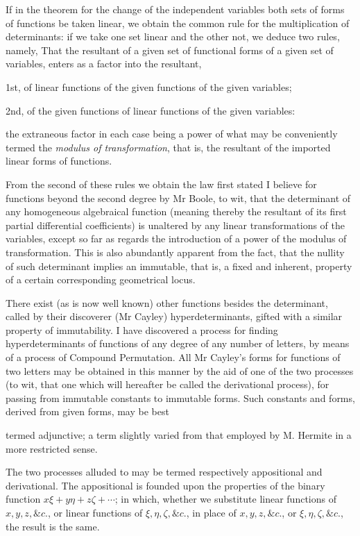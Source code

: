 \documentclass[11pt]{article}
\newcommand{\sourcepage}[1]{\marginpar{\scriptsize p.~#1}}
\begin{document}
{{If in the theorem for the change of the independent variables both sets of forms of functions be taken linear, we obtain the common rule for the multiplication of determinants: if we take one set linear and the other not, we deduce two rules, namely, That the resultant of a given set of functional forms of a given set of variables, enters as a factor into the resultant,

1st, of linear functions of the given functions of the given variables;

2nd, of the given functions of linear functions of the given variables:

the extraneous factor in each case being a power of what may be conveniently termed the \emph{modulus of transformation}, that is, the resultant of the imported linear forms of functions.

From the second of these rules we obtain the law first stated I believe for functions beyond the second degree by Mr Boole, to wit, that the determinant of any homogeneous algebraical function (meaning thereby the resultant of its first partial differential coefficients) is unaltered by any linear transformations of the variables, except so far as regards the introduction of a power of the modulus of transformation. This is also abundantly apparent from the fact, that the nullity of such determinant implies an immutable, that is, a fixed and inherent, property of a certain corresponding geometrical locus.

There exist (as is now well known) other functions besides the determinant, called by their discoverer (Mr Cayley) hyperdeterminants, gifted with a similar property of immutability. I have discovered a process for finding hyperdeterminants of functions of any degree of any number of letters, by means of a process of Compound Permutation. All Mr Cayley's forms for functions of two letters may be obtained in this manner by the aid of one of the two processes (to wit, that one which will hereafter be called the derivational process), for passing from immutable constants to immutable forms. Such constants and forms, derived from given forms, may be best

\sourcepage{186}
termed adjunctive; a term slightly varied from that employed by M. Hermite in a more restricted sense.

The two processes alluded to may be termed respectively appositional and derivational. The appositional is founded upon the properties of the binary function $x\xi+y\eta+z\zeta+\cdots$; in which, whether we substitute linear functions of $x,y,z,\&c.$, or linear functions of $\xi,\eta,\zeta,\&c.$, in place of $x,y,z,\&c.$, or $\xi,\eta,\zeta,\&c.$, the result is the same.

}}
\end{document}
